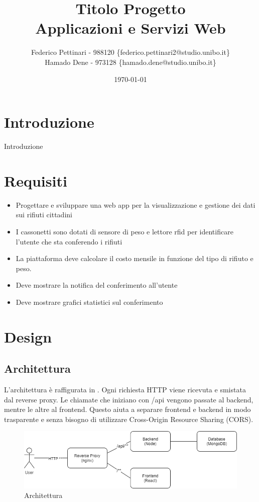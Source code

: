 \documentclass{report}
\title{
    Titolo Progetto \\
    \large Applicazioni e Servizi Web
}
\author{Federico Pettinari - 988120 \{federico.pettinari2@studio.unibo.it\}\\
Hamado Dene - 973128 \{hamado.dene@studio.unibo.it\}}
\date{\today}
\begin{document}
\maketitle
\section{Introduzione}
Introduzione \citep{adams1995hitchhiker}

\section{Requisiti}
\begin{itemize}
    \item Progettare e sviluppare una web app per la visualizzazione e gestione dei dati sui rifiuti cittadini
    \item I cassonetti sono dotati di sensore di peso e lettore rfid per identificare l’utente che sta conferendo i rifiuti
    \item La piattaforma deve calcolare il costo mensile in funzione del tipo di rifiuto e peso.
    \item Deve mostrare la notifica del conferimento all’utente
    \item Deve mostrare grafici statistici sul conferimento
\end{itemize}

\section{Design}
\subsection{Architettura}
L'architettura è raffigurata in .
Ogni richiesta HTTP viene ricevuta e smistata dal reverse proxy.
Le chiamate che iniziano con /api vengono passate al backend, mentre le altre al frontend.
Questo aiuta a separare frontend e backend in modo trasparente e senza bisogno di utilizzare Cross-Origin Resource Sharing (CORS).

\begin{figure}[h!]
\centering
\includegraphics[width=\textwidth]{arch}
\caption{Architettura}
\label{fig:arch}
\end{figure}
\end{document}
